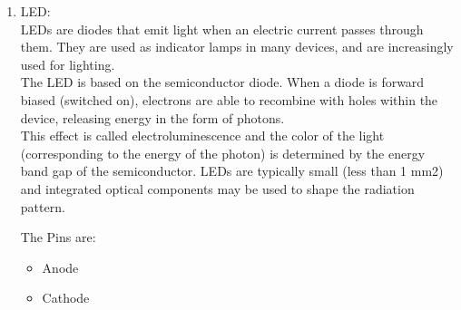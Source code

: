 \documentclass[11pt]{article}
\begin{document}
\begin{enumerate}
	\item LED: \\


	      LEDs are diodes that emit light when an electric current passes through them. They are used as indicator lamps in many devices, and are increasingly used for lighting. \\

	      The LED is based on the semiconductor diode. When a diode is forward biased (switched on), electrons are able to recombine with holes within the device, releasing energy in the form of photons.\\

	      This effect is called electroluminescence and the color of the light (corresponding to the energy of the photon) is determined by the energy band gap of the semiconductor. LEDs are typically small (less than 1 mm2) and integrated optical components may be used to shape the radiation pattern.

	      The Pins are:
	      \begin{itemize}
		      \item Anode
		      \item Cathode
	      \end{itemize}

\end{enumerate}
\end{document}
